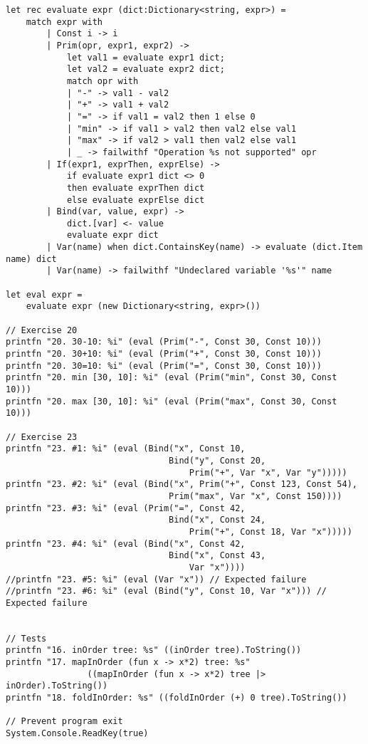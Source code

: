 \begin{lstlisting}
let rec evaluate expr (dict:Dictionary<string, expr>) =
    match expr with
        | Const i -> i
        | Prim(opr, expr1, expr2) ->
            let val1 = evaluate expr1 dict;
            let val2 = evaluate expr2 dict;
            match opr with
            | "-" -> val1 - val2
            | "+" -> val1 + val2
            | "=" -> if val1 = val2 then 1 else 0
            | "min" -> if val1 > val2 then val2 else val1
            | "max" -> if val2 > val1 then val2 else val1
            | _ -> failwithf "Operation %s not supported" opr
        | If(expr1, exprThen, exprElse) ->
            if evaluate expr1 dict <> 0
            then evaluate exprThen dict
            else evaluate exprElse dict
        | Bind(var, value, expr) ->
            dict.[var] <- value
            evaluate expr dict
        | Var(name) when dict.ContainsKey(name) -> evaluate (dict.Item name) dict
        | Var(name) -> failwithf "Undeclared variable '%s'" name

let eval expr =
    evaluate expr (new Dictionary<string, expr>())

// Exercise 20
printfn "20. 30-10: %i" (eval (Prim("-", Const 30, Const 10)))
printfn "20. 30+10: %i" (eval (Prim("+", Const 30, Const 10)))
printfn "20. 30=10: %i" (eval (Prim("=", Const 30, Const 10)))
printfn "20. min [30, 10]: %i" (eval (Prim("min", Const 30, Const 10)))
printfn "20. max [30, 10]: %i" (eval (Prim("max", Const 30, Const 10)))

// Exercise 23
printfn "23. #1: %i" (eval (Bind("x", Const 10,
                                Bind("y", Const 20, 
                                    Prim("+", Var "x", Var "y")))))
printfn "23. #2: %i" (eval (Bind("x", Prim("+", Const 123, Const 54),
                                Prim("max", Var "x", Const 150))))
printfn "23. #3: %i" (eval (Prim("=", Const 42, 
                                Bind("x", Const 24,
                                    Prim("+", Const 18, Var "x")))))
printfn "23. #4: %i" (eval (Bind("x", Const 42,
                                Bind("x", Const 43, 
                                    Var "x"))))
//printfn "23. #5: %i" (eval (Var "x")) // Expected failure
//printfn "23. #6: %i" (eval (Bind("y", Const 10, Var "x"))) // Expected failure


// Tests
printfn "16. inOrder tree: %s" ((inOrder tree).ToString())
printfn "17. mapInOrder (fun x -> x*2) tree: %s" 
				((mapInOrder (fun x -> x*2) tree |> inOrder).ToString())
printfn "18. foldInOrder: %s" ((foldInOrder (+) 0 tree).ToString())

// Prevent program exit
System.Console.ReadKey(true)
\end{lstlisting}
